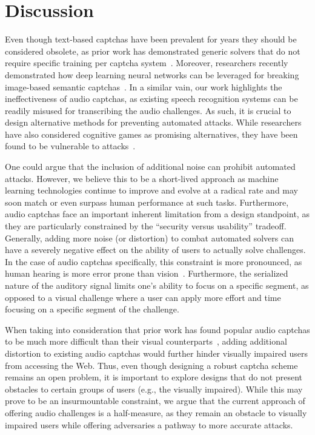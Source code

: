 \section{Discussion}
\label{sec:discussion}

Even though text-based captchas have been prevalent for years they should be considered
obsolete, as prior work has demonstrated generic solvers that do not require specific training per captcha system~\cite{185128}.
Moreover, researchers recently demonstrated how deep learning neural networks can be leveraged for breaking image-based 
semantic captchas~\cite{sivakorn:eurosp16}. In a similar vain, our work highlights the ineffectiveness of audio 
captchas, as existing speech recognition systems can be readily misused for transcribing the audio challenges.
As such, it is crucial to design alternative methods for preventing automated attacks. While researchers 
have also considered cognitive games as promising alternatives, they have been found to be vulnerable to 
attacks~\cite{mohamed2017security}.

One could argue that the inclusion of additional noise can prohibit automated attacks. However, we believe this to be
a short-lived approach as machine learning technologies continue to improve and evolve at a radical rate and may soon
match or even surpass human performance at such tasks.
Furthermore, audio captchas face an important inherent limitation from a design standpoint, as they are particularly
constrained by the ``security versus usability'' tradeoff. Generally, adding more noise (or distortion) 
to combat automated solvers can have a severely negative effect on the ability of users to actually solve challenges.
In the case of audio captchas specifically, this constraint is more pronounced, as human hearing is more error prone 
than vision~\cite{o2009auditory,shinn2008object}. Furthermore, the serialized nature of the auditory signal limits 
one's ability to focus on a specific segment, as opposed to a visual challenge where a user can apply more effort and 
time focusing on a specific segment of the challenge.

When taking into consideration that prior work has found popular audio captchas to be much more difficult 
than their visual counterparts~\cite{bigham2009evaluating,captchas-are-hard},
adding additional distortion to existing audio captchas would further hinder visually impaired users from accessing the Web.
Thus, even though designing a robust captcha scheme remains an open problem, it is important 
to explore designs that do not present obstacles to certain groups of users (e.g., the visually impaired).
While this may prove to be an insurmountable constraint, we argue that the current approach of offering audio
challenges is a half-measure, as they remain an obstacle to visually impaired users while offering 
adversaries a pathway to more accurate attacks.
